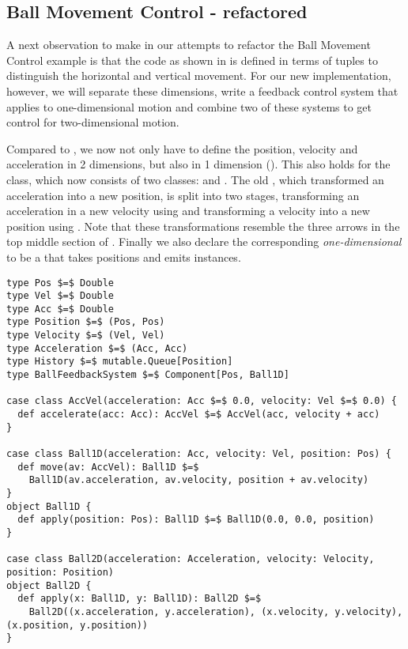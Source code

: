 \subsection{Ball Movement Control - refactored}
A next observation to make in our attempts to refactor the Ball Movement Control example is that the code as shown in  is defined in terms of tuples to distinguish the horizontal and vertical movement. For our new implementation, however, we will separate these dimensions, write a feedback control system that applies to one-dimensional motion and combine two of these systems to get control for two-dimensional motion.

Compared to , we now not only have to define the position, velocity and acceleration in 2 dimensions, but also in 1 dimension (). This also holds for the  class, which now consists of two classes:  and . The old , which transformed an acceleration into a new position, is split into two stages, transforming an acceleration in a new velocity using  and transforming a velocity into a new position using . Note that these transformations resemble the three arrows in the top middle section of . Finally we also declare the corresponding \emph{one-dimensional}  to be a \comp that takes positions and emits  instances. 

\begin{minipage}{\linewidth}
\begin{lstlisting}[style=ScalaStyle, caption={Ball motion physics}, label={lst:ball-physics-new}]
type Pos $=$ Double
type Vel $=$ Double
type Acc $=$ Double
type Position $=$ (Pos, Pos)
type Velocity $=$ (Vel, Vel)
type Acceleration $=$ (Acc, Acc)
type History $=$ mutable.Queue[Position]
type BallFeedbackSystem $=$ Component[Pos, Ball1D]

case class AccVel(acceleration: Acc $=$ 0.0, velocity: Vel $=$ 0.0) {
  def accelerate(acc: Acc): AccVel $=$ AccVel(acc, velocity + acc)
}

case class Ball1D(acceleration: Acc, velocity: Vel, position: Pos) {
  def move(av: AccVel): Ball1D $=$
    Ball1D(av.acceleration, av.velocity, position + av.velocity)
}
object Ball1D {
  def apply(position: Pos): Ball1D $=$ Ball1D(0.0, 0.0, position)
}

case class Ball2D(acceleration: Acceleration, velocity: Velocity, position: Position)
object Ball2D {
  def apply(x: Ball1D, y: Ball1D): Ball2D $=$
    Ball2D((x.acceleration, y.acceleration), (x.velocity, y.velocity), (x.position, y.position))
}
\end{lstlisting}
\end{minipage}

